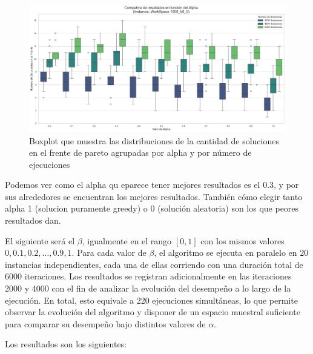\documentclass[12pt,a4paper]{book}
\begin{document}
\begin{figure}[H]
    \centering
    \includegraphics[width=\linewidth]{images_finetuning/alpha}
    \caption{Boxplot que muestra las distribuciones de la cantidad de soluciones en el frente de pareto agrupadas por alpha y por número de ejecuciones}
    \label{fig:alpha}
\end{figure}




Podemos ver como el alpha qu eparece tener mejores resultados es el 0.3, y por sus alrededores se encuentran los mejores resultados.
También cómo elegir tanto alpha 1 (solucion puramente greedy) o 0 (solución aleatoria) son los que peores resultados dan.

El siguiente será el $\beta$, igualmente en el rango $[0,1]$ con los mismos valores $0, 0.1, 0.2, \dots, 0.9, 1$.  
Para cada valor de $\beta$, el algoritmo se ejecuta en paralelo en 20 instancias independientes, cada una de ellas corriendo con una duración total de 6000 iteraciones. Los resultados se registran adicionalmente en las iteraciones 2000 y 4000 con el fin de analizar la evolución del desempeño a lo largo de la ejecución.
En total, esto equivale a 220 ejecuciones simultáneas, lo que permite observar la evolución del algoritmo y disponer de un espacio muestral suficiente para comparar su desempeño bajo distintos valores de $\alpha$.

Los resultados son los siguientes:
\end{document}

